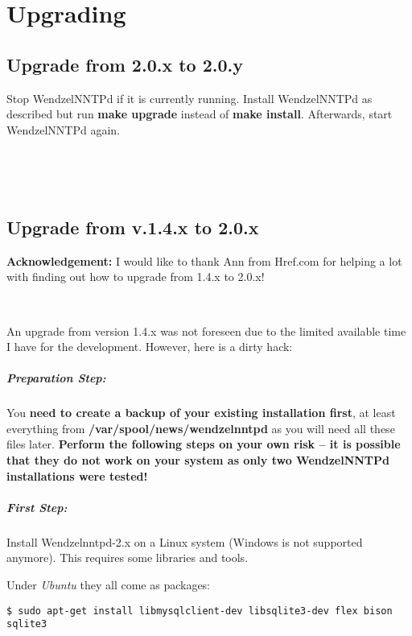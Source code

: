 \chapter{Upgrading}\label{Ch:Upgrade}

\section{Upgrade from 2.0.x to 2.0.y}

Stop WendzelNNTPd if it is currently running. Install WendzelNNTPd as described but run {\bf make upgrade} instead of {\bf make install}. Afterwards, start WendzelNNTPd again.

~

~

\section{Upgrade from v.1.4.x to 2.0.x}

{\bf Acknowledgement:} I would like to thank Ann from Href.com for helping a lot with finding out how to upgrade from 1.4.x to 2.0.x!

~

An upgrade from version 1.4.x was not foreseen due to the limited available time I have for the development. However, here is a dirty hack:

\paragraph*{Preparation Step:} You \textbf{need to create a backup of your existing installation first}, at least everything from \textbf{/var/spool/news/wendzelnntpd} as you will need all these files later. \textbf{Perform the following steps on your own risk -- it is possible that they do not work on your system as only two WendzelNNTPd installations were tested!}

\paragraph*{First Step:} Install Wendzelnntpd-2.x on a Linux system (Windows is not supported anymore). This requires some libraries and tools.

Under {\it Ubuntu} they all come as packages:
\begin{verbatim}
$ sudo apt-get install libmysqlclient-dev libsqlite3-dev flex bison sqlite3
\end{verbatim}

